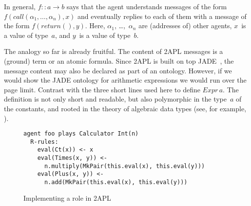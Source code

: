 \documentclass[a4paper,12pt,oneside,fleqn]{book} %
\theoremstyle{plain}
\theoremstyle{definition}
\theoremstyle{remark}
\begin{document}
In general, $f::a\to b$ says that the agent understands messages of the
form $f(\mathit{call}(\alpha_1,\ldots,\alpha_n),x)$ and eventually replies
to each of them with a message of the form $f(\mathit{return}(),y)$. Here,
$\alpha_1$, \dots,~$\alpha_n$ are (addresses of) other agents, $x$~is a
value of type~$a$, and $y$~is a value of type~$b$.

The analogy so far is already fruitful. The content of 2APL messages is a
(ground) term or an atomic formula. Since 2APL is built on top
JADE~\cite{DBLP:books/sp/map2005/BellifemineBCP05}, the message content may
also be declared as part of an ontology. However, if we would show the JADE
ontology for arithmetic expressions we would run over the page limit.
Contrast with the three short lines used here to define $\mathit{Expr}\,a$.
The definition is not only short and readable, but also polymorphic in the
type~$a$ of the constants, and rooted in the theory of algebraic data types
(see, for example, \cite{DBLP:conf/ctcs/Hagino87}).

\begin{figure}\footnotesize %
\begin{verbatim}
agent foo plays Calculator Int(n)
  R-rules:
    eval(Ct(x)) <- x
    eval(Times(x, y)) <-
      n.multiply(MkPair(this.eval(x), this.eval(y)))
    eval(Plus(x, y)) <-
      n.add(MkPair(this.eval(x), this.eval(y)))
\end{verbatim}
\caption{Implementing a role in 2APL}\label{fig:roleimpl2APL}
\end{figure} %
\end{document}
